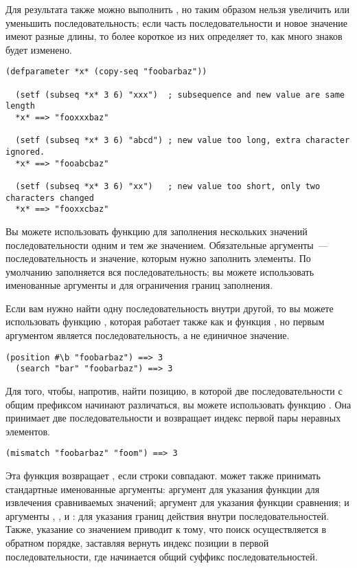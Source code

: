 Для результата  также можно выполнить , но таким образом нельзя увеличить
или уменьшить последовательность; если часть последовательности и новое значение имеют
разные длины, то более короткое из них определяет то, как много знаков будет изменено.

\begin{lstlisting}[style=lisprepl]
  (defparameter *x* (copy-seq "foobarbaz"))

  (setf (subseq *x* 3 6) "xxx")  ; subsequence and new value are same length
  *x* ==> "fooxxxbaz"

  (setf (subseq *x* 3 6) "abcd") ; new value too long, extra character ignored.
  *x* ==> "fooabcbaz"

  (setf (subseq *x* 3 6) "xx")   ; new value too short, only two characters changed
  *x* ==> "fooxxcbaz"
\end{lstlisting}

Вы можете использовать функцию  для заполнения нескольких значений
последовательности одним и тем же значением.  Обязательные аргументы~---
последовательность и значение, которым нужно заполнить элементы.  По умолчанию
заполняется вся последовательность; вы можете использовать именованные аргументы
 и  для ограничения границ заполнения.

Если вам нужно найти одну последовательность внутри другой, то вы можете использовать
функцию , которая работает также как и функция , но первым
аргументом является последовательность, а не единичное значение.

\begin{lstlisting}[style=lisprepl]
  (position #\b "foobarbaz") ==> 3
  (search "bar" "foobarbaz") ==> 3
\end{lstlisting}

Для того, чтобы, напротив, найти позицию, в которой две последовательности с общим
префиксом начинают различаться, вы можете использовать функцию .  Она
принимает две последовательности и возвращает индекс первой пары неравных элементов.

\begin{lstlisting}[style=lisprepl]
  (mismatch "foobarbaz" "foom") ==> 3
\end{lstlisting}

Эта функция возвращает , если строки совпадают.  может также
принимать стандартные именованные аргументы: аргумент  для указания функции для
извлечения сравниваемых значений; аргумент  для указания функции сравнения; и
аргументы , ,  и : для указания границ
действия внутри последовательностей.  Также, указание  со значением
 приводит к тому, что поиск осуществляется в обратном порядке, заставляя
 вернуть индекс позиции в первой последовательности, где начинается общий
суффикс последовательностей.


